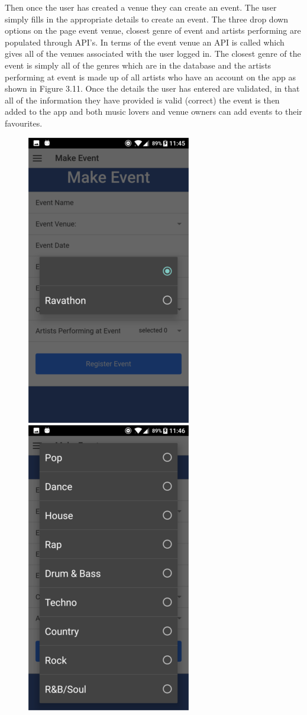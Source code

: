 Then once the user has created a venue they can create an event. The user simply fills in the appropriate details to create an event. The three drop down options on the page event venue, closest genre of event and artists performing are populated through API's. In terms of the event venue an API is called which gives all of the venues associated with the user logged in. The closest genre of the event is simply all of the genres which are in the database and the artists performing at event is made up of all artists who have an account on the app as shown in Figure 3.11. Once the details the user has entered are validated, in that all of the information they have provided is valid (correct) the event is then added to the app and both music lovers and venue owners can add events to their favourites. 
\begin{center}
\begin{figure}[H]
\includegraphics[scale=0.5]{images/sc16}
\includegraphics[scale=0.5]{images/sc17}

\end{figure}
\end{center}
